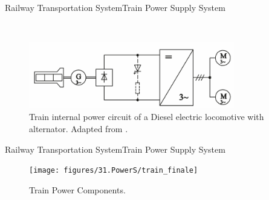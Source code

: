\begin{frame}{Railway Transportation System}{Train Power Supply System}
\begin{minipage}[t]{0.24\linewidth} ~ \end{minipage}
\begin{minipage}[t]{0.48\linewidth}
	
	\begin{figure}[ht!]
		\centering
		\includegraphics[width=0.8\textwidth,keepaspectratio]{figures/31.PowerS/steimel2008c}
		\caption{Train internal power circuit of a Diesel electric locomotive with alternator. Adapted from \cite{steimel2008}.}
	\end{figure}
\end{minipage}

\end{frame}

\begin{frame}{Railway Transportation System}{Train Power Supply System}


\begin{figure}[h!]
	\centering
	\texttt{[image: figures/31.PowerS/train\_finale]}
	\caption{Train Power Components.}
	\label{fig:abad2016}
\end{figure}


\end{frame}


